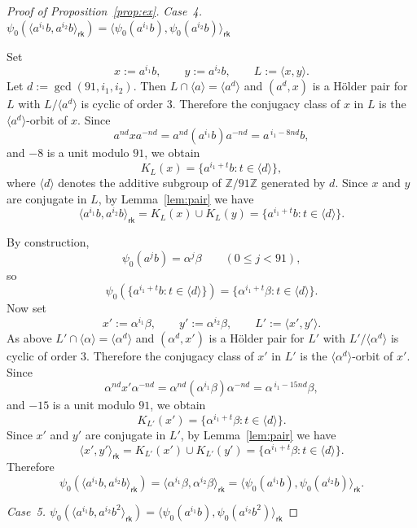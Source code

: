 \documentclass[a4paper,12pt]{article}
\theoremstyle{definition}
\theoremstyle{remark}
\begin{document}
\begin{proof}[Proof of Proposition~\ref{prop:ex}]
  
  
  \medskip
  \noindent
  \emph{Case~4.\; $\psi_0(\langle a^{i_1}b,a^{i_2}b\rangle_{\mathsf{rk}}) = \langle \psi_0(a^{i_1}b),\psi_0(a^{i_2}b)\rangle_{\mathsf{rk}}$}
  
  \medskip
  Set
  $$ x:=a^{i_1}b,\qquad y:=a^{i_2}b,\qquad L:=\langle x,y\rangle. $$
  Let $d:=\gcd(91,i_1,i_2)$. Then $L\cap \langle a\rangle = \langle a^d\rangle$ and $(a^d,x)$ is a Hölder pair for $L$ with $L/\langle a^d\rangle$ is cyclic of order $3$. Therefore the conjugacy class of $x$ in $L$ is the $\langle a^d\rangle$-orbit of $x$. Since
  $$ a^{nd}xa^{-nd}=a^{nd}(a^{i_1}b)a^{-nd}=a^{\,i_1-8nd}b, $$
  and $-8$ is a unit modulo $91$, we obtain
  $$ K_L(x)=\{a^{i_1+t}b : t\in \langle d\rangle\}, $$
  where $\langle d\rangle$ denotes the additive subgroup of $\mathbb{Z}/91\mathbb{Z}$ generated by $d$. Since $x$ and $y$ are conjugate in $L$, by Lemma~\ref{lem:pair} we have
  $$ \langle a^{i_1}b,a^{i_2}b\rangle_{\mathsf{rk}} = K_L(x)\cup K_L(y) = \{a^{i_1+t}b : t\in \langle d\rangle\}. $$
  
  By construction,
  $$ \psi_0(a^jb)=\alpha^j\beta \qquad (0\leq j<91), $$
  so
  $$ \psi_0(\{a^{i_1+t}b : t\in \langle d\rangle\}) = \{\alpha^{i_1+t}\beta : t\in \langle d\rangle\}. $$
  Now set
  $$ x':=\alpha^{i_1}\beta,\qquad y':=\alpha^{i_2}\beta,\qquad L':=\langle x',y'\rangle. $$
  As above $L'\cap \langle \alpha\rangle=\langle \alpha^d\rangle$ and $(\alpha^d,x')$ is a Hölder pair for $L'$ with $L'/\langle\alpha^d \rangle$ is cyclic of order $3$. Therefore the conjugacy class of $x'$ in $L'$ is the $\langle \alpha^d\rangle$-orbit of $x'$. Since
  $$ \alpha^{nd}x'\alpha^{-nd} = \alpha^{nd}(\alpha^{i_1}\beta)\alpha^{-nd} = \alpha^{\,i_1-15nd}\beta, $$
  and $-15$ is a unit modulo $91$, we obtain
  $$ K_{L'}(x')=\{\alpha^{i_1+t}\beta : t\in \langle d\rangle\}. $$
  Since $x'$ and $y'$ are conjugate in $L'$, by Lemma~\ref{lem:pair} we have 
  $$ \langle x',y'\rangle_{\mathsf{rk}} = K_{L'}(x')\cup K_{L'}(y') = \{\alpha^{i_1+t}\beta : t\in \langle d\rangle\}. $$
  Therefore
  $$ \psi_0(\langle a^{i_1}b,a^{i_2}b\rangle_{\mathsf{rk}}) = \langle \alpha^{i_1}\beta,\alpha^{i_2}\beta\rangle_{\mathsf{rk}} = \langle \psi_0(a^{i_1}b),\psi_0(a^{i_2}b)\rangle_{\mathsf{rk}}. $$
  
  
  \medskip
  \noindent
  \emph{Case~5.\; $\psi_0(\langle a^{i_1}b,a^{i_2}b^2\rangle_{\mathsf{rk}}) = \langle \psi_0(a^{i_1}b),\psi_0(a^{i_2}b^2)\rangle_{\mathsf{rk}}$}
  

\end{proof}
\end{document}
